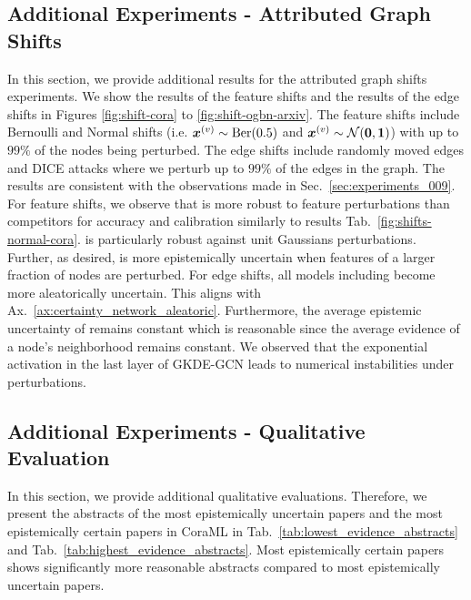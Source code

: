 \subsection{Additional Experiments - Attributed Graph Shifts}

In this section, we provide additional results for the attributed graph shifts experiments. We show the results of the feature shifts and the results of the edge shifts in Figures \ref{fig:shift-cora} to \ref{fig:shift-ogbn-arxiv}. The feature shifts include Bernoulli and Normal shifts (i.e. $\bm{x}^{(v)} \sim \operatorname{Ber}(0.5)$ and $\bm{x}^{(v)} \sim \operatorname{\mathcal{N}}(\bm{0}, \bm{1})$) with up to $99\%$ of the nodes being perturbed. The edge shifts include randomly moved edges and DICE attacks \citep{Waniek2018} where we perturb up to $99\%$ of the edges in the graph. The results are consistent with the observations made in Sec.~\ref{sec:experiments_009}. For feature shifts, we observe that \GPNacro{} is more robust to feature perturbations than competitors for accuracy and calibration similarly to results Tab.~\ref{fig:shifts-normal-cora}. \GPNacro{} is particularly robust against unit Gaussians perturbations. Further, as desired, \GPNacro{} is more epistemically uncertain when features of a larger fraction of nodes are perturbed. For edge shifts, all models including \GPNacro{} become more aleatorically uncertain. This aligns with Ax.~\ref{ax:certainty_network_aleatoric}. Furthermore, the average epistemic uncertainty of \GPNacro{} remains constant which is reasonable since the average evidence of a node's neighborhood remains constant. We observed that the exponential activation in the last layer of GKDE-GCN leads to numerical instabilities under perturbations.
%








%

\subsection{Additional Experiments - Qualitative Evaluation}
\label{sec:add-exp-qualitative}

In this section, we provide additional qualitative evaluations. Therefore, we present the abstracts of the most epistemically uncertain papers and the most epistemically certain papers in CoraML in Tab.~\ref{tab:lowest_evidence_abstracts} and Tab.~\ref{tab:highest_evidence_abstracts}. Most epistemically certain papers shows significantly more reasonable abstracts compared to most epistemically uncertain papers.

